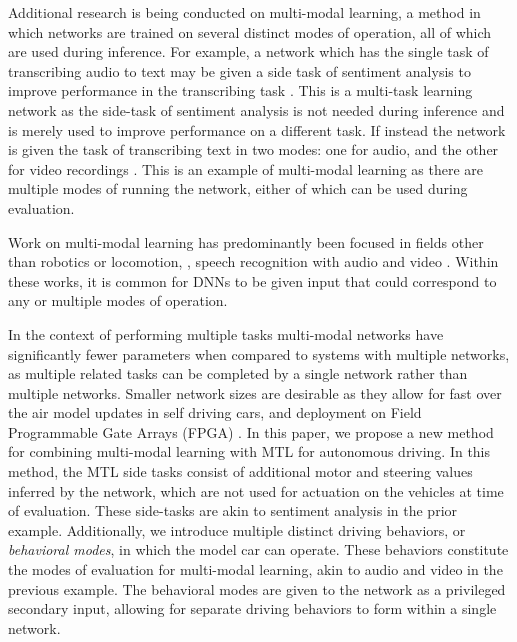 Additional research is being conducted on multi-modal learning, a method in which networks are trained on several distinct modes of operation, all of which are used during inference.
For example, a network which has the single task of transcribing audio to text may be given a side task of sentiment analysis to improve performance in the transcribing task \cite{6639012}. This is a multi-task learning network as the side-task of sentiment analysis is not needed during inference and is merely used to improve performance on a different task. If instead the network is given the task of transcribing text in two modes: one for audio, and the other for video recordings \cite{ngiam2011multimodal}. This is an example of multi-modal learning as there are multiple modes of running the network, either of which can be used during evaluation.

Work on multi-modal learning has predominantly been focused in fields other than robotics or locomotion, \eg, speech recognition with audio and video \cite{ngiam2011multimodal, 6639012, rosas2013multimodal}. Within these works, it is common for DNNs to be given input that could correspond to any or multiple modes of operation. 

In the context of performing multiple tasks multi-modal networks have significantly fewer parameters when compared to systems with multiple networks, as multiple related tasks can be completed by a single network rather than multiple networks. Smaller network sizes are desirable as they allow for fast over the air model updates in self driving cars, and deployment on Field Programmable Gate Arrays (FPGA) \cite{DBLP:journals/corr/IandolaMAHDK16}.
In this paper, we propose a new method for combining multi-modal learning with MTL for autonomous driving.
In this method, the MTL side tasks consist of additional motor and steering values inferred by the network, which are not used for actuation on the vehicles at time of evaluation. These side-tasks are akin to sentiment analysis in the prior example.
Additionally, we introduce multiple distinct driving behaviors, or \textit{behavioral modes}, in which the model car can operate.
These behaviors constitute the modes of evaluation for multi-modal learning, akin to audio and video in the previous example.
The behavioral modes are given to the network as a privileged secondary input, allowing for separate driving behaviors to form within a single network.

